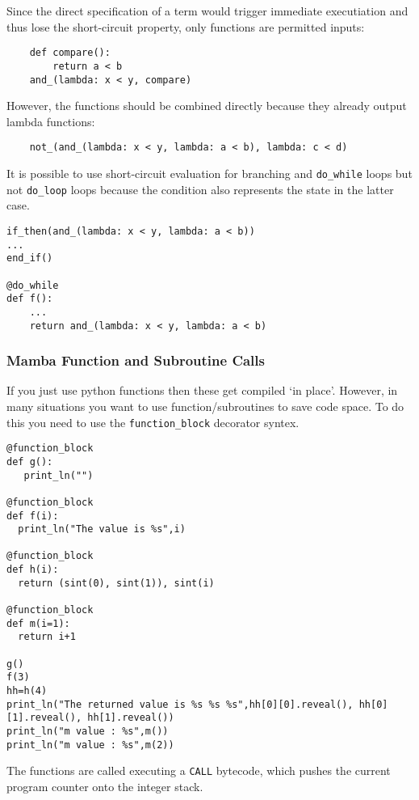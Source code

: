Since the direct specification of a term would trigger immediate
executiation and thus lose the short-circuit property, only functions
are permitted inputs:

\begin{lstlisting}
    def compare():
        return a < b
    and_(lambda: x < y, compare)
\end{lstlisting}
However, the functions should be combined directly because they
already output lambda functions:

\begin{lstlisting}
    not_(and_(lambda: x < y, lambda: a < b), lambda: c < d)
\end{lstlisting}
It is possible to use short-circuit evaluation for branching and
\verb+do_while+ loops but not \verb+do_loop+ loops because the
condition also represents the state in the latter case.

\begin{lstlisting}
if_then(and_(lambda: x < y, lambda: a < b))
...
end_if()

@do_while
def f():
    ...
    return and_(lambda: x < y, lambda: a < b)
\end{lstlisting}

\subsubsection{Mamba Function and Subroutine Calls}
If you just use python functions then these get compiled
`in place'. However, in many situations you want to use
function/subroutines to save code space. To do this
you need to use the \verb+function_block+ decorator syntex.
\begin{lstlisting}
@function_block
def g():
   print_ln("")

@function_block
def f(i):
  print_ln("The value is %s",i)

@function_block
def h(i):
  return (sint(0), sint(1)), sint(i)

@function_block
def m(i=1):
  return i+1

g()
f(3)
hh=h(4)
print_ln("The returned value is %s %s %s",hh[0][0].reveal(), hh[0][1].reveal(), hh[1].reveal())
print_ln("m value : %s",m())
print_ln("m value : %s",m(2))
\end{lstlisting}
The functions are called executing a \verb+CALL+ bytecode, which
pushes the current program counter onto the integer stack.

